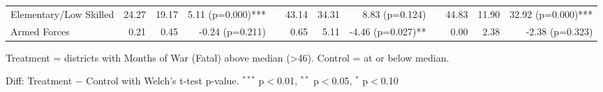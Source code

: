 \begin{table}[htbp]
\begin{tabular}{l rrr c rrr c rrr}
\quad Elementary/Low Skilled & 24.27 & 19.17 & 5.11 (p=0.000)*** &  & 43.14 & 34.31 & 8.83 (p=0.124) &  & 44.83 & 11.90 & 32.92 (p=0.000)*** \\
\quad Armed Forces & 0.21 & 0.45 & -0.24 (p=0.211) &  & 0.65 & 5.11 & -4.46 (p=0.027)** &  & 0.00 & 2.38 & -2.38 (p=0.323) \\
\bottomrule
\end{tabular}
\begin{tablenotes}
\small
\item Treatment = districts with Months of War (Fatal) above median (>46). Control = at or below median.
\item Diff: Treatment $-$ Control with Welch's t-test p-value. $^{{***}}$ p$<$0.01, $^{{**}}$ p$<$0.05, $^{{*}}$ p$<$0.10
\end{tablenotes}
\end{table}